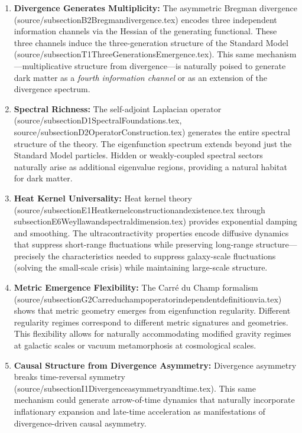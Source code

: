 \documentclass[12pt,a4paper]{article}
\begin{document}
\begin{enumerate}
\item \textbf{Divergence Generates Multiplicity:} The asymmetric Bregman divergence (source/subsectionB2Bregmandivergence.tex) encodes three independent information channels via the Hessian of the generating functional. These three channels induce the three-generation structure of the Standard Model (source/subsectionT1ThreeGenerationsEmergence.tex). This same mechanism---multiplicative structure from divergence---is naturally poised to generate dark matter as a \textit{fourth information channel} or as an extension of the divergence spectrum.

\item \textbf{Spectral Richness:} The self-adjoint Laplacian operator (source/subsectionD1SpectralFoundations.tex, source/subsectionD2OperatorConstruction.tex) generates the entire spectral structure of the theory. The eigenfunction spectrum extends beyond just the Standard Model particles. Hidden or weakly-coupled spectral sectors naturally arise as additional eigenvalue regions, providing a natural habitat for dark matter.

\item \textbf{Heat Kernel Universality:} Heat kernel theory (source/subsectionE1Heatkernelconstructionandexistence.tex through subsectionE6Weyllawandspectraldimension.tex) provides exponential damping and smoothing. The ultracontractivity properties encode diffusive dynamics that suppress short-range fluctuations while preserving long-range structure---precisely the characteristics needed to suppress galaxy-scale fluctuations (solving the small-scale crisis) while maintaining large-scale structure.

\item \textbf{Metric Emergence Flexibility:} The Carré du Champ formalism (source/subsectionG2Carreduchampoperatorindependentdefinitionvia.tex) shows that metric geometry emerges from eigenfunction regularity. Different regularity regimes correspond to different metric signatures and geometries. This flexibility allows for naturally accommodating modified gravity regimes at galactic scales or vacuum metamorphosis at cosmological scales.

\item \textbf{Causal Structure from Divergence Asymmetry:} Divergence asymmetry breaks time-reversal symmetry (source/subsectionI1Divergenceasymmetryandtime.tex). This same mechanism could generate arrow-of-time dynamics that naturally incorporate inflationary expansion and late-time acceleration as manifestations of divergence-driven causal asymmetry.

\end{enumerate}
\end{document}
